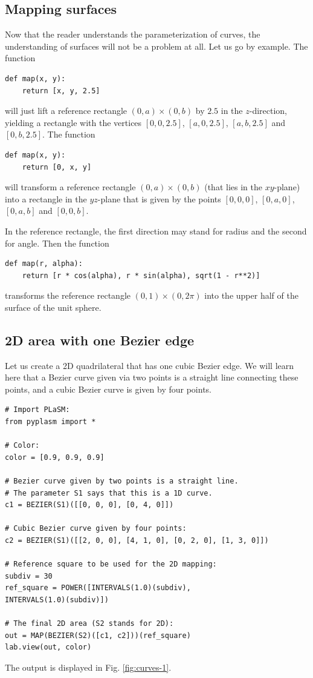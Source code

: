 \documentclass[article,A4,12pt]{llncs}
\begin{document}
\subsection{Mapping surfaces}

Now that the reader understands the parameterization of curves, the 
understanding of surfaces will not be a problem at all. Let us go by 
example. The function 

\begin{verbatim}
def map(x, y):
    return [x, y, 2.5]
\end{verbatim}
will just lift a reference rectangle $(0, a)\times(0, b)$ by $2.5$ in the $z$-direction,
yielding a rectangle with the vertices $[0, 0, 2.5]$, $[a, 0, 2.5]$,
$[a, b, 2.5]$ and $[0, b, 2.5]$. 
The function 

\begin{verbatim}
def map(x, y):
    return [0, x, y]
\end{verbatim}
will transform a reference rectangle $(0, a)\times(0, b)$ (that lies in the $xy$-plane)
into a rectangle in the $yz$-plane that is given by the points $[0, 0, 0]$, $[0, a, 0]$,
$[0, a, b]$ and $[0, 0, b]$. 

In the reference rectangle, the first direction may
stand for radius and the second for angle. Then the function 

\begin{verbatim}
def map(r, alpha):
    return [r * cos(alpha), r * sin(alpha), sqrt(1 - r**2)]
\end{verbatim}
transforms the reference rectangle $(0, 1)\times (0, 2\pi)$ into 
the upper half of the surface of the unit sphere.

\subsection{2D area with one Bezier edge}

Let us create a 2D quadrilateral that has one cubic Bezier edge. We will learn here
that a Bezier curve given via two points is a straight line connecting 
these points, and a cubic Bezier curve is given by four points.

\begin{verbatim}
# Import PLaSM:
from pyplasm import *

# Color:
color = [0.9, 0.9, 0.9]
  
# Bezier curve given by two points is a straight line.
# The parameter S1 says that this is a 1D curve. 
c1 = BEZIER(S1)([[0, 0, 0], [0, 4, 0]])

# Cubic Bezier curve given by four points:
c2 = BEZIER(S1)([[2, 0, 0], [4, 1, 0], [0, 2, 0], [1, 3, 0]])

# Reference square to be used for the 2D mapping:
subdiv = 30
ref_square = POWER([INTERVALS(1.0)(subdiv),
INTERVALS(1.0)(subdiv)])

# The final 2D area (S2 stands for 2D):
out = MAP(BEZIER(S2)([c1, c2]))(ref_square)
lab.view(out, color)
\end{verbatim}
The output is displayed in Fig. \ref{fig:curves-1}.
\end{document}
